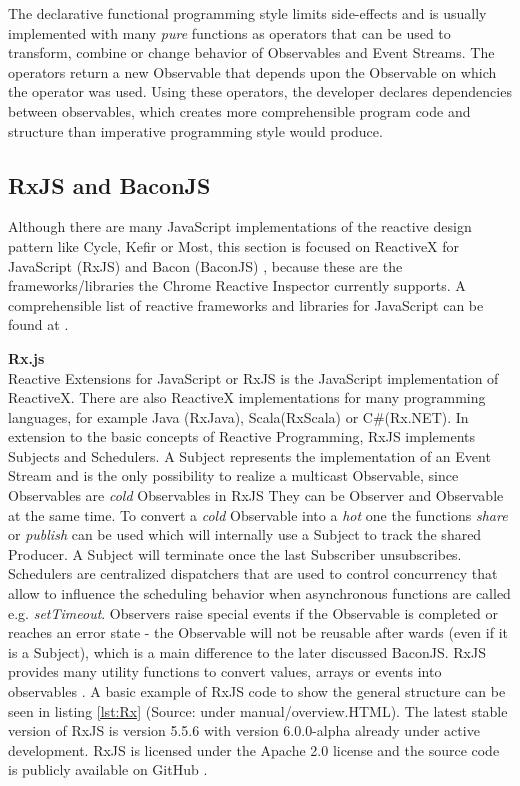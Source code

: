 	The declarative functional programming style limits side-effects and is usually implemented with many \emph{pure} functions as operators that can be used to transform, combine or change behavior of Observables and Event Streams. The operators return a new Observable that depends upon the Observable on which the operator was used. Using these operators, the developer declares dependencies between observables, which creates more comprehensible program code and structure \cite[Why Reactive Programming?]{ReactiveInspector} than imperative programming style would produce. 	

	\subsection{RxJS and BaconJS}
	Although there are many JavaScript implementations of the reactive design pattern like Cycle\cite{CycleJS}, Kefir\cite{KefirJS} or  Most\cite{MostJS}, this section is focused on ReactiveX for JavaScript (RxJS) \cite{RxJS} and Bacon (BaconJS) \cite{BaconJS}, because these are the frameworks/libraries the Chrome Reactive Inspector currently supports. A comprehensible list of reactive frameworks and libraries for JavaScript can be found at \cite{FRPJSList}.
	
	\textbf{Rx.js}\\
	Reactive Extensions for JavaScript or RxJS is the JavaScript implementation of ReactiveX. There are also ReactiveX implementations for many programming languages, for example Java (RxJava), Scala(RxScala) or C\#(Rx.NET). In extension to the basic concepts of Reactive Programming, RxJS implements Subjects and Schedulers. A Subject represents the implementation of an Event Stream and is the only possibility to realize a multicast Observable, since Observables are \emph{cold} Observables in RxJS They can be Observer and Observable at the same time. To convert a \emph{cold} Observable into a \emph{hot} one the functions \emph{share} or \emph{publish} can be used which will internally use a Subject to track the shared Producer. A Subject will terminate once the last Subscriber unsubscribes. Schedulers are centralized dispatchers that are used to control concurrency that allow to influence the scheduling behavior when asynchronous functions are called e.g. \emph{setTimeout}\cite{RxJsDocu}.
	Observers raise special events if the Observable is completed or reaches an error state - the Observable will not be reusable after wards (even if it is a Subject), which is a main difference to the later discussed BaconJS. RxJS provides many utility functions to convert values, arrays or events into observables \cite{ThesisBaradur}. A basic example of RxJS code to show the general structure can be seen in listing \ref{lst:Rx} (Source: \cite{RxJsDocu} under manual/overview.HTML).
	The latest stable version of RxJS is version 5.5.6 with version 6.0.0-alpha already under active development. RxJS is licensed under the Apache 2.0 license and the source code is publicly available on GitHub \cite{RxJS}.

